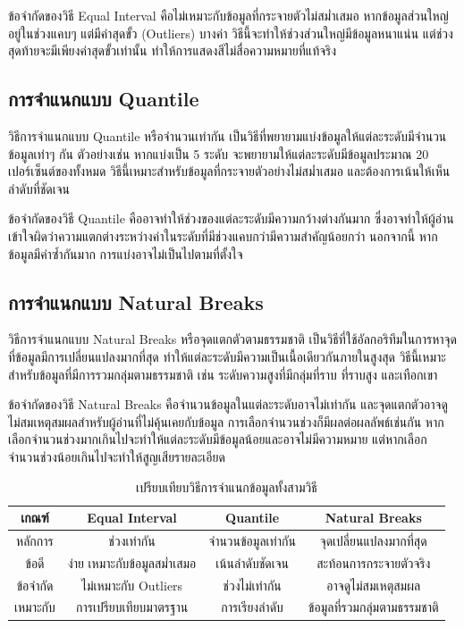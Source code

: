 ข้อจำกัดของวิธี Equal Interval คือไม่เหมาะกับข้อมูลที่กระจายตัวไม่สม่ำเสมอ หากข้อมูลส่วนใหญ่อยู่ในช่วงแคบๆ แต่มีค่าสุดขั้ว (Outliers) บางค่า วิธีนี้จะทำให้ช่วงส่วนใหญ่มีข้อมูลหนาแน่น แต่ช่วงสุดท้ายจะมีเพียงค่าสุดขั้วเท่านั้น ทำให้การแสดงสีไม่สื่อความหมายที่แท้จริง

\subsection{การจำแนกแบบ Quantile}

วิธีการจำแนกแบบ Quantile หรือจำนวนเท่ากัน เป็นวิธีที่พยายามแบ่งข้อมูลให้แต่ละระดับมีจำนวนข้อมูลเท่าๆ กัน ตัวอย่างเช่น หากแบ่งเป็น 5 ระดับ จะพยายามให้แต่ละระดับมีข้อมูลประมาณ 20 เปอร์เซ็นต์ของทั้งหมด วิธีนี้เหมาะสำหรับข้อมูลที่กระจายตัวอย่างไม่สม่ำเสมอ และต้องการเน้นให้เห็นลำดับที่ชัดเจน

ข้อจำกัดของวิธี Quantile คืออาจทำให้ช่วงของแต่ละระดับมีความกว้างต่างกันมาก ซึ่งอาจทำให้ผู้อ่านเข้าใจผิดว่าความแตกต่างระหว่างค่าในระดับที่มีช่วงแคบกว่ามีความสำคัญน้อยกว่า นอกจากนี้ หากข้อมูลมีค่าซ้ำกันมาก การแบ่งอาจไม่เป็นไปตามที่ตั้งใจ

\subsection{การจำแนกแบบ Natural Breaks}

วิธีการจำแนกแบบ Natural Breaks หรือจุดแตกตัวตามธรรมชาติ เป็นวิธีที่ใช้อัลกอริทึมในการหาจุดที่ข้อมูลมีการเปลี่ยนแปลงมากที่สุด ทำให้แต่ละระดับมีความเป็นเนื้อเดียวกันภายในสูงสุด วิธีนี้เหมาะสำหรับข้อมูลที่มีการรวมกลุ่มตามธรรมชาติ เช่น ระดับความสูงที่มีกลุ่มที่ราบ ที่ราบสูง และเทือกเขา

ข้อจำกัดของวิธี Natural Breaks คือจำนวนข้อมูลในแต่ละระดับอาจไม่เท่ากัน และจุดแตกตัวอาจดูไม่สมเหตุสมผลสำหรับผู้อ่านที่ไม่คุ้นเคยกับข้อมูล การเลือกจำนวนช่วงก็มีผลต่อผลลัพธ์เช่นกัน หากเลือกจำนวนช่วงมากเกินไปจะทำให้แต่ละระดับมีข้อมูลน้อยและอาจไม่มีความหมาย แต่หากเลือกจำนวนช่วงน้อยเกินไปจะทำให้สูญเสียรายละเอียด

\begin{table}[ht]
    \centering
    \caption{เปรียบเทียบวิธีการจำแนกข้อมูลทั้งสามวิธี}
    \label{tab:classification-methods}
    \begin{tabular}{|c|c|c|c|}
        \hline
        \textbf{เกณฑ์} & \textbf{Equal Interval} & \textbf{Quantile} & \textbf{Natural Breaks} \\
        \hline
        หลักการ & ช่วงเท่ากัน & จำนวนข้อมูลเท่ากัน & จุดเปลี่ยนแปลงมากที่สุด \\
        \hline
        ข้อดี & ง่าย เหมาะกับข้อมูลสม่ำเสมอ & เน้นลำดับชัดเจน & สะท้อนการกระจายตัวจริง \\
        \hline
        ข้อจำกัด & ไม่เหมาะกับ Outliers & ช่วงไม่เท่ากัน & อาจดูไม่สมเหตุสมผล \\
        \hline
        เหมาะกับ & การเปรียบเทียบมาตรฐาน & การเรียงลำดับ & ข้อมูลที่รวมกลุ่มตามธรรมชาติ \\
        \hline
    \end{tabular}
\end{table}

